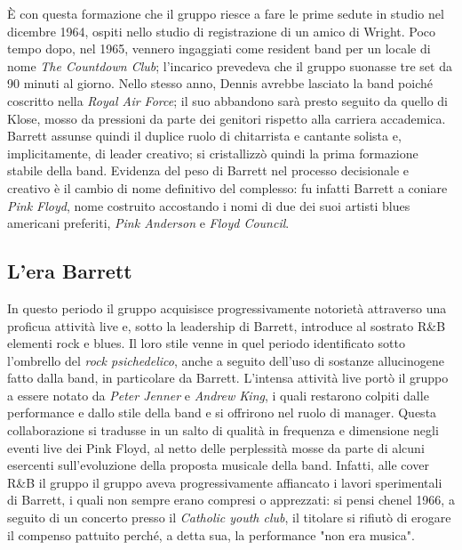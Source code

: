\documentclass[class=book, crop=false, oneside, 12pt]{standalone}
\begin{document}
    È con questa formazione che il gruppo riesce a fare le prime sedute in studio nel dicembre 1964, ospiti nello studio di registrazione di un amico di Wright. Poco tempo dopo, nel 1965, vennero ingaggiati come resident band per un locale di nome \emph{The Countdown Club}; l'incarico prevedeva che il gruppo suonasse tre set da 90 minuti al giorno. Nello stesso anno, Dennis avrebbe lasciato la band poiché coscritto nella \emph{Royal Air Force}; il suo abbandono sarà presto seguito da quello di Klose, mosso da pressioni da parte dei genitori rispetto alla carriera accademica. Barrett assunse quindi il duplice ruolo di chitarrista e cantante solista e, implicitamente, di leader creativo; si cristallizzò  quindi la prima formazione stabile della band. Evidenza del peso di Barrett nel processo decisionale e creativo è il cambio di nome definitivo del complesso: fu infatti Barrett a coniare \emph{Pink Floyd}, nome costruito accostando i nomi di due dei suoi artisti blues americani preferiti, \emph{Pink Anderson} e \emph{Floyd Council}.
    
    \subsection{L'era Barrett}
    In questo periodo il gruppo acquisisce progressivamente notorietà attraverso una proficua attività live e, sotto la leadership di Barrett, introduce al sostrato R\&B elementi rock e blues. Il loro stile venne in quel periodo identificato sotto l'ombrello del \emph{rock psichedelico}, anche a seguito dell'uso di sostanze allucinogene fatto dalla band, in particolare da Barrett. L'intensa attività live portò il gruppo a essere notato da \emph{Peter Jenner} e \emph{Andrew King}, i quali restarono colpiti dalle performance e dallo stile della band e si offrirono nel ruolo di manager. Questa collaborazione si tradusse in un salto di qualità in frequenza e dimensione negli eventi live dei Pink Floyd, al netto delle perplessità mosse da parte di alcuni esercenti sull'evoluzione della proposta musicale della band. Infatti, alle cover R\&B il gruppo  il gruppo aveva progressivamente affiancato i lavori sperimentali di Barrett, i quali non sempre erano compresi o apprezzati: si pensi chenel 1966, a seguito di un concerto presso il \emph{Catholic youth club}, il titolare si rifiutò di erogare il compenso pattuito perché, a detta sua, la performance "non era musica". {%
    \parfillskip=0pt
    \parskip=0pt
    \par}
    
\end{document}
